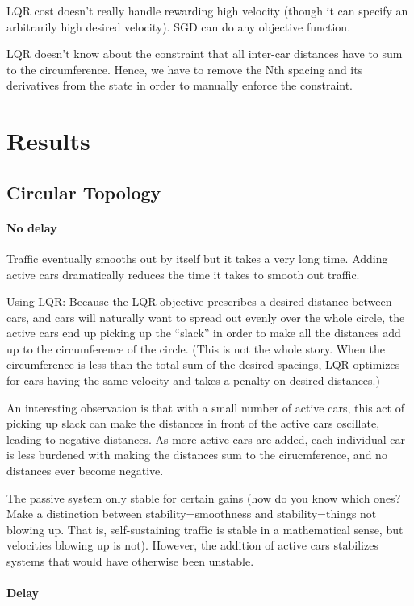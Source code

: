 \documentclass[10pt,twocolumn]{article}
\begin{document}
LQR cost doesn't really handle rewarding high velocity (though it can specify an arbitrarily high desired velocity). SGD can do any objective function.

LQR doesn't know about the constraint that all inter-car distances have to sum to the circumference. Hence, we have to remove the Nth spacing and its derivatives from the state in order to manually enforce the constraint.

\section{Results}

\subsection{Circular Topology}

\paragraph{No delay} Traffic eventually smooths out by itself but it takes a very long time. Adding active cars dramatically reduces the time it takes to smooth out traffic. 

Using LQR: Because the LQR objective prescribes a desired distance between cars, and cars will naturally want to spread out evenly over the whole circle, the active cars end up picking up the ``slack'' in order to make all the distances add up to the circumference of the circle. (This is not the whole story. When the circumference is less than the total sum of the desired spacings, LQR optimizes for cars having the same velocity and takes a penalty on desired distances.)

An interesting observation is that with a small number of active cars, this act of picking up slack can make the distances in front of the active cars oscillate, leading to negative distances. As more active cars are added, each individual car is less burdened with making the distances sum to the cirucmference, and no distances ever become negative.

The passive system only stable for certain gains (how do you know which ones? Make a distinction between stability=smoothness and stability=things not blowing up. That is, self-sustaining traffic is stable in a mathematical sense, but velocities blowing up is not). However, the addition of active cars stabilizes systems that would have otherwise been unstable.

\paragraph{Delay}
\end{document}
